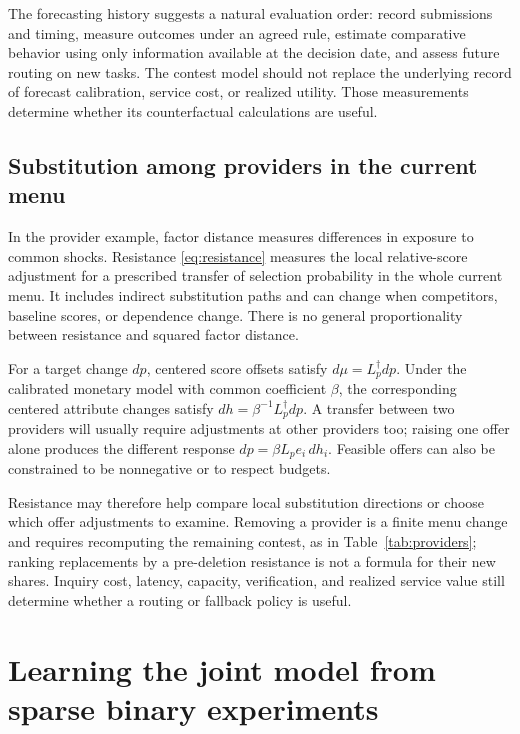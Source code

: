 \documentclass[11pt]{amsart}
\theoremstyle{definition}
\begin{document}
The forecasting history suggests a natural evaluation order: record submissions and timing, measure outcomes under an agreed rule, estimate comparative behavior using only information available at the decision date, and assess future routing on new tasks. The contest model should not replace the underlying record of forecast calibration, service cost, or realized utility. Those measurements determine whether its counterfactual calculations are useful.

\subsection{Substitution among providers in the current menu}
In the provider example, factor distance measures differences in exposure
to common shocks. Resistance \eqref{eq:resistance} measures the local
relative-score adjustment for a prescribed transfer of selection probability
in the whole current menu. It includes indirect substitution paths and can
change when competitors, baseline scores, or dependence change. There is no
general proportionality between resistance and squared factor distance.

For a target change $dp$, centered score offsets satisfy
$d\mu=L_p^\dagger dp$. Under the calibrated monetary model with common
coefficient $\beta$, the corresponding centered attribute changes satisfy
$dh=\beta^{-1}L_p^\dagger dp$. A transfer between two providers will usually
require adjustments at other providers too; raising one offer alone produces
the different response $dp=\beta L_pe_i\,dh_i$. Feasible offers can also be
constrained to be nonnegative or to respect budgets.

Resistance may therefore help compare local substitution directions or
choose which offer adjustments to examine. Removing a provider is a finite
menu change and requires recomputing the remaining contest, as in
Table~\ref{tab:providers}; ranking replacements by a pre-deletion resistance
is not a formula for their new shares. Inquiry cost, latency, capacity,
verification, and realized service value still determine whether a routing
or fallback policy is useful.

\section{Learning the joint model from sparse binary experiments}\label{sec:identification}
\end{document}
